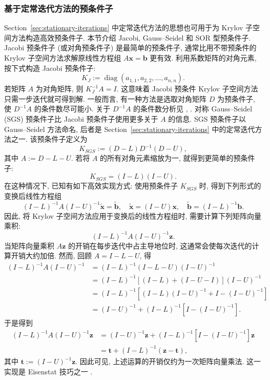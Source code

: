 \subsubsection{{基于定常迭代方法的预条件子}}\label{subsec:stationary-preconditioners}
{Section\ \ref{sec:stationary-iterations} 中定常迭代方法的思想也可用于为 Krylov 子空间方法构造高效预条件子. 本节介绍 Jacobi, Gauss--Seidel 和 SOR 型预条件子.}
{Jacobi 预条件子 (或对角预条件子) 是最简单的预条件子, 通常比用不带预条件的 Krylov 子空间方法求解原线性方程组 $A\bm x=\bm b$ 更有效. 利用系数矩阵的对角元素, 按下式构造 Jacobi 预条件子:}
\[K_J:=\operatorname{diag}(a_{1,1},a_{2,2},\ldots,a_{n,n}).\]
{若矩阵 $A$ 为对角矩阵, 则 $K_J^{-1}A=I$. 这意味着 Jacobi 预条件 Krylov 子空间方法只需一步迭代就可得到解. 一般而言, 有一种方法是选取对角矩阵 $D$ 为预条件子, 使 $D^{-1}A$ 的条件数尽可能小. 关于 $D^{-1}A$ 的条件数分析见 , .}
{对称 Gauss--Seidel (SGS) 预条件子比 Jacobi 预条件子使用更多关于 $A$ 的信息. SGS 预条件子以 Gauss--Seidel 方法命名, 后者是 Section\ \ref{sec:stationary-iterations} 中的定常迭代方法之一. 该预条件子定义为}
\[K_{SGS}:=(D-L)D^{-1}(D-U),\]
{其中 $A:=D-L-U$. 若将 $A$ 的所有对角元素缩放为一, 就得到更简单的预条件子:}
\[K_{SGS}=(I-L)(I-U).\]
{在这种情况下, 已知有如下高效实现方式: 使用预条件子 $K_{SGS}$ 时, 得到下列形式的变换后线性方程组}
\[(I-L)^{-1}A(I-U)^{-1}\widetilde{\bm x}=\widetilde{\bm b},\quad\widetilde{\bm x}=(I-U)\bm x,\quad\widetilde{\bm b}=(I-L)^{-1}\bm b.\]
{因此, 将 Krylov 子空间方法应用于变换后的线性方程组时, 需要计算下列矩阵向量乘积:}
\[(I-L)^{-1}A(I-U)^{-1}\bm z.\]
{当矩阵向量乘积 $A\bm z$ 的开销在每步迭代中占主导地位时, 这通常会使每次迭代的计算开销大约加倍. 然而, 回顾 $A=I-L-U$, 得}
\[\begin{aligned}(I-L)^{-1}A(I-U)^{-1}&=(I-L)^{-1}(I-L-U)(I-U)^{-1}\\
&=(I-L)^{-1}[(I-L)+(I-U-I)](I-U)^{-1}\\
&=(I-L)^{-1}[(I-L)(I-U)^{-1}+I-(I-U)^{-1}]\\
&=(I-U)^{-1}+(I-L)^{-1}[I-(I-U)^{-1}].\end{aligned}\]
{于是得到}
\[\begin{aligned}(I-L)^{-1}A(I-U)^{-1}\bm z&=(I-U)^{-1}\bm z+(I-L)^{-1}[I-(I-U)^{-1}]\bm z\\&=\bm t+(I-L)^{-1}(\bm z-\bm t),\end{aligned}\]
{其中 $\bm t:=(I-U)^{-1}\bm z$. 因此可见, 上述运算的开销仅约为一次矩阵向量乘法. 这一实现是 Eisenstat 技巧之一 .}
